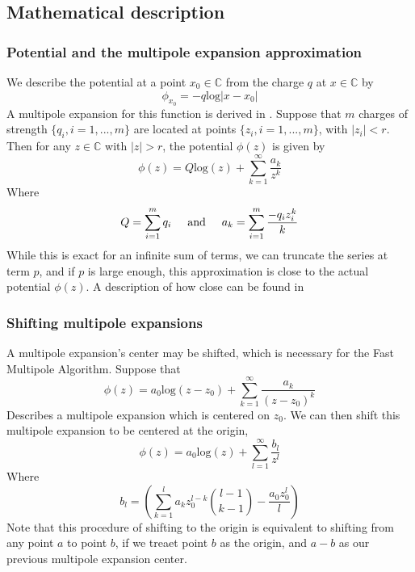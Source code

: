 \documentclass[pdftex,twoside,a4paper]{report}
\newcommand{\fma}{Fast Multipole Algorithm}
\begin{document}
\subsection{Mathematical description}
\subsubsection{Potential and the multipole expansion approximation}
We describe the potential at a point $x_0 \in \mathbb{C}$ from the charge $q$ at $x \in \mathbb{C}$ by
\begin{equation}
\phi_{x_0} = -q\text{log}{|x - x_0|}
\label{eq:potential}
\end{equation}
A multipole expansion for this function is derived in \cite{greengard:315}. Suppose that $m$ charges of strength $\{q_i,i=1,...,m\}$ are located at points $\{z_i, i=1,...,m\}$, with $|z_i| < r$. Then for any $z \in \mathbb{C}$ with $|z| > r$, the potential $\phi(z)$ is given by
\begin{equation}
\phi(z) = Q \text{log}(z) + \sum_{k=1} ^{\infty} \frac{a_k}{z^k}
\label{eq:multipole_expansion}
\end{equation}
Where
\begin{equation}
Q = \sum_{i=1} ^m q_i 
\hspace{0.5cm} \text{and} \hspace{0.5cm}
a_k = \sum_{i=1} ^m \frac{-q_i z^k _i}{k}
\end{equation}
While this is exact for an infinite sum of terms, we can truncate the series at term $p$, and if $p$ is large enough, this approximation is close to the actual potential $\phi(z)$. A description of how close can be found in \cite{greengard:315}
\subsubsection{Shifting multipole expansions}
A multipole expansion's center may be shifted, which is necessary for the \fma. Suppose that
\begin{equation}
\phi(z) = a_0 \text{log}(z-z_0) + \sum_{k=1} ^{\infty} \frac{a_k}{(z-z_0)^k}
\label{eq:pre_shift_multipole}
\end{equation}
Describes a multipole expansion which is centered on $z_0$. We can then shift this multipole expansion to be centered at the origin,
\begin{equation}
\phi(z) = a_0 \text{log}(z) + \sum_{l=1} ^{\infty} \frac{b_l}{z^l}
\label{eq:shifted_multipole}
\end{equation}
Where
\begin{equation}
b_l = \left(\sum_{k=1} ^l a_k z_0^{l-k} \binom{l-1}{k-1} - \frac{a_0 z_0^l}{l} \right)
\label{eq:b_descr}
\end{equation}
Note that this procedure of shifting to the origin is equivalent to shifting from any point $a$ to point $b$, if we treaet point $b$ as the origin, and $a-b$ as our previous multipole expansion center.
\end{document}

